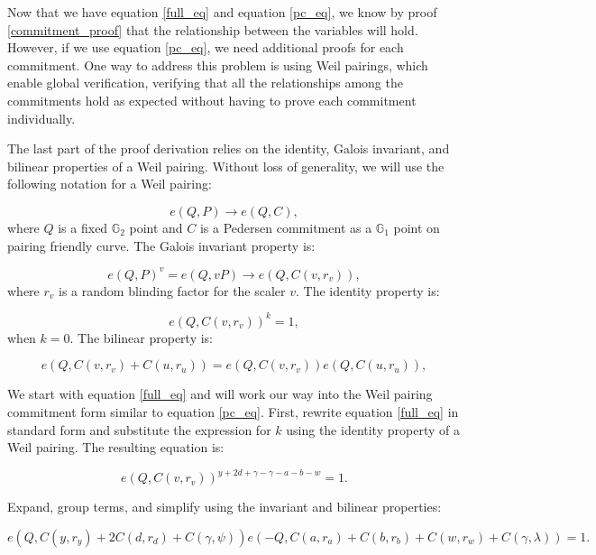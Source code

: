 \documentclass[version=preprint]{iacrcc}
\begin{document}
Now that we have equation \ref{full_eq} and equation \ref{pc_eq}, we know by proof \ref{commitment_proof} that the relationship between the variables will hold. However, if we use equation \ref{pc_eq}, we need additional proofs for each commitment. One way to address this problem is using Weil pairings, which enable global verification, verifying that all the relationships among the commitments hold as expected without having to prove each commitment individually.

The last part of the proof derivation relies on the identity, Galois invariant, and bilinear properties \cite{silverman86} of a Weil pairing. Without loss of generality, we will use the following notation for a Weil pairing:

\begin{equation}
e(Q, P) \rightarrow e(Q, C),
\end{equation}
where \( Q \) is a fixed \( \mathbb{G}_{2} \) point and \(C\) is a Pedersen commitment as a \( \mathbb{G}_{1} \) point on pairing friendly curve. The Galois invariant property is:

\begin{equation}
e(Q, P)^v = e(Q, v P) \rightarrow e(Q, C(v, r_{v})),
\end{equation}
where $r_{v}$ is a random blinding factor for the scaler $v$. The identity property is:

\begin{equation}
e(Q, C(v, r_{v}))^{k} = 1,
\end{equation}
when \( k = 0 \). The bilinear property is:

\begin{equation}
e(Q, C(v, r_{v}) + C(u, r_{u})) = e(Q, C(v, r_{v}))e(Q, C(u, r_{u})),
\end{equation}

We start with equation \ref{full_eq} and will work our way into the Weil pairing commitment form similar to equation \ref{pc_eq}. First, rewrite equation \ref{full_eq} in standard form and substitute the expression for \( k \) using the identity property of a Weil pairing. The resulting equation is:

\begin{equation}
e(Q, C(v, r_{v}))^{y + 2d + \gamma - \gamma - a - b - w} = 1.
\end{equation}

Expand, group terms, and simplify using the invariant and bilinear properties:

\begin{equation}
e(Q, C(y, r_{y}) + 2 C(d, r_{d}) + C(\gamma, \psi))e(-Q, C(a, r_{a}) + C(b, r_{b}) + C(w, r_{w}) + C(\gamma, \lambda)) = 1.
\end{equation}
\end{document}
